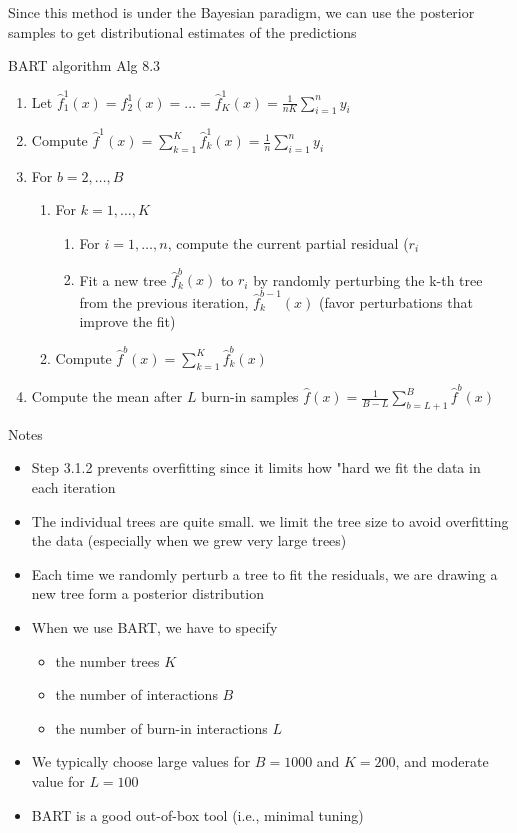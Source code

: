 \documentclass[
]{book}
\begin{document}
Since this method is under the Bayesian paradigm, we can use the posterior samples to get distributional estimates of the predictions

BART algorithm \citep{james2013} Alg 8.3

\begin{enumerate}
\def\labelenumi{\arabic{enumi}.}
\item
  Let \(\hat{f}_1^1(x) = f^1_2(x) = \dots = \hat{f}_K^1(x) = \frac{1}{nK} \sum_{i=1}^n y_i\)
\item
  Compute \(\hat{f}^1 (x) = \sum_{k=1}^K \hat{f}_k^1 (x) = \frac{1}{n}\sum_{i=1}^n y_i\)
\item
  For \(b = 2, \dots, B\)

  \begin{enumerate}
  \def\labelenumii{\arabic{enumii}.}
  \item
    For \(k = 1, \dots, K\)

    \begin{enumerate}
    \def\labelenumiii{\arabic{enumiii}.}
    \item
      For \(i = 1, \dots , n\), compute the current partial residual (\(r_i\)
    \item
      Fit a new tree \(\hat{f}_k^b(x)\) to \(r_i\) by randomly perturbing the k-th tree from the previous iteration, \(\hat{f}_k^{b-1}(x)\) (favor perturbations that improve the fit)
    \end{enumerate}
  \item
    Compute \(\hat{f}^b (x) = \sum_{k=1}^K \hat{f}^b_k (x)\)
  \end{enumerate}
\item
  Compute the mean after \(L\) burn-in samples \(\hat{f}(x) = \frac{1}{B - L} \sum_{b = L +1}^B \hat{f}^b (x)\)
\end{enumerate}

Notes

\begin{itemize}
\item
  Step 3.1.2 prevents overfitting since it limits how "hard we fit the data in each iteration
\item
  The individual trees are quite small. we limit the tree size to avoid overfitting the data (especially when we grew very large trees)
\item
  Each time we randomly perturb a tree to fit the residuals, we are drawing a new tree form a posterior distribution
\item
  When we use BART, we have to specify

  \begin{itemize}
  \item
    the number trees \(K\)
  \item
    the number of interactions \(B\)
  \item
    the number of burn-in interactions \(L\)
  \end{itemize}
\item
  We typically choose large values for \(B = 1000\) and \(K =200\), and moderate value for \(L=100\)
\item
  BART is a good out-of-box tool (i.e., minimal tuning)
\end{itemize}
\end{document}
